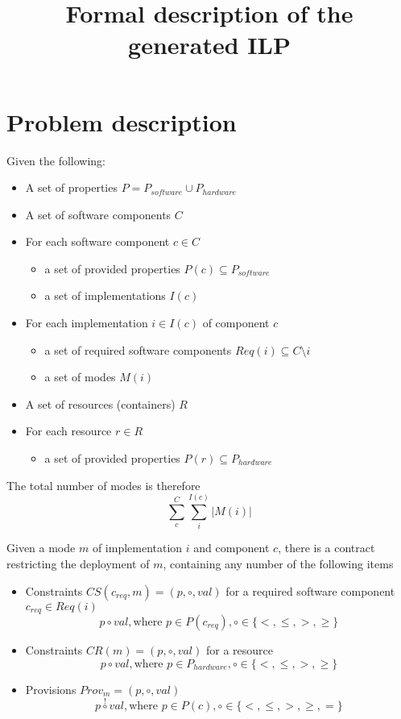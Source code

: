 \documentclass[10pt,a4paper]{article}
\title{Formal description of the generated ILP}
\begin{document}
\section{Problem description}

Given the following:

\begin{itemize}
	\item A set of properties $P = P_{software} \cup P_{hardware}$
	\item A set of software components $C$
	\item For each software component $c \in C$
	\begin{itemize}
		\item a set of provided properties $P(c) \subseteq P_{software}$
		\item a set of implementations $I(c)$
	\end{itemize}
	\item For each implementation $i \in I(c)$ of component $c$
	\begin{itemize}
		\item a set of required software components $Req(i) \subseteq C \setminus i$
		\item a set of modes $M(i)$
	\end{itemize}
	\item A set of resources (containers) $R$
	\item For each resource $r \in R$
	\begin{itemize}
		\item a set of provided properties $P(r) \subseteq P_{hardware}$
	\end{itemize}
\end{itemize}

The total number of modes is therefore
\begin{equation}
	\sum_{c}^{C} \sum_{i}^{I(c)} |M(i)|
\end{equation}

Given a mode $m$ of implementation $i$ and component $c$, there is a contract restricting the deployment of $m$, containing any number of the following items

\begin{itemize}
	\item Constraints $CS(c_{req},m) = (p, \circ, val)$ for a required software component $c_{req} \in Req(i)$
	\begin{equation}
	p \circ val, \text{where } p \in P(c_{req}), \circ \in \{<, \leq, >, \geq \}
	\end{equation}
	\item Constraints $CR(m) = (p, \circ, val)$ for a resource
	\begin{equation}
	p \circ val, \text{where } p \in P_{hardware}, \circ \in \{<, \leq, >, \geq \}
	\end{equation}
	\item Provisions $Prov_m = (p, \circ, val)$
	\begin{equation}
	p \overset{!}{\circ} val, \text{where } p \in P(c), \circ \in \{<, \leq, >, \geq, = \}
	\end{equation}
\end{itemize}
\end{document}
